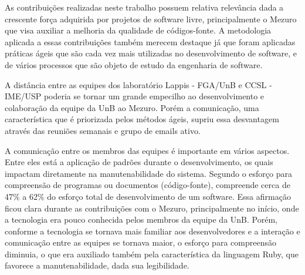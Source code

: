 As contribuições realizadas neste trabalho possuem relativa relevância dada a crescente força adquirida por projetos de software livre, principalmente o Mezuro que visa auxiliar a melhoria da qualidade de códigos-fonte. A metodologia aplicada a essas contribuições também merecem destaque já que foram aplicadas práticas ágeis que são cada vez mais utilizadas no desenvolvimento de software, e de vários processos que são objeto de estudo da engenharia de software.

A distância entre as equipes dos laboratório Lappis - FGA/UnB e CCSL - IME/USP poderia se tornar um grande empecilho ao desenvolvimento e colaboração da equipe da UnB ao Mezuro. Porém a comunicação, uma característica que é priorizada pelos métodos ágeis, supriu essa desvantagem através das reuniões semanais e grupo de emails ativo.

A comunicação entre os membros das equipes é importante em vários aspectos. Entre eles está a aplicação de padrões durante o desenvolvimento, os quais impactam diretamente na manutenabilidade do sistema. Segundo \citeauthor{pigoski1996practical} o esforço para compreensão de programas ou documentos (código-fonte), compreende cerca de 47\% a 62\% do esforço total de desenvolvimento de um software. Essa afirmação ficou clara durante as contribuições com o Mezuro, principalmente no início, onde a tecnologia era pouco conhecida pelos membros da equipe da UnB. Porém, conforme a tecnologia se tornava mais familiar aos desenvolvedores e a interação e  comunicação entre as equipes se tornava maior, o esforço para compreensão diminuia, o que era auxiliado também pela característica da linguagem Ruby, que favorece a manutenabilidade, dada sua legibilidade. 



